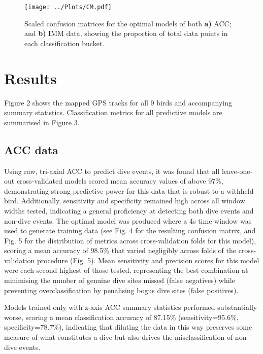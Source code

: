 \documentclass[11pt]{article}
\begin{document}
    
    \begin{figure}[b!]
	    \centering\texttt{[image: ../Plots/CM.pdf]}
	    \caption{Scaled confusion matrices for the optimal models of both \textbf{a)} ACC; and \textbf{b)} IMM data, showing the proportion of total data points in each classification bucket.}
    \end{figure}
    
    \section{Results}
    Figure 2 shows the mapped GPS tracks for all 9 birds and accompanying summary statistics. Classification metrics for all predictive models are summarised in Figure 3. 
    
    \subsection{ACC data}
    Using raw, tri-axial ACC to predict dive events, it was found that all leave-one-out cross-validated models scored mean accuracy values of above 97\%, demonstrating strong predictive power for this data that is robust to a withheld bird. Additionally, sensitivity and specificity remained high across all window widths tested, indicating a general proficiency at detecting both dive events and non-dive events. The optimal model was produced where a 4s time window was used to generate training data (see Fig. 4 for the resulting confusion matrix, and Fig. 5 for the distribution of metrics across cross-validation folds for this model), scoring a mean accuracy of 98.5\% that varied negligibly across folds of the cross-validation procedure (Fig. 5). Mean sensitivity and precision scores for this model were each second highest of those tested, representing the best combination at minimising the number of genuine dive sites missed (false negatives) while preventing overclassification by penalising bogus dive sites (false positives).
    
    Models trained only with z-axis ACC summary statistics performed substantially worse, scoring a mean classification accuracy of 87.15\% (sensitivity=95.6\%, specificity=78.7\%), indicating that diluting the data in this way preserves some measure of what constitutes a dive but also drives the misclassification of non-dive events.
    
\end{document}
